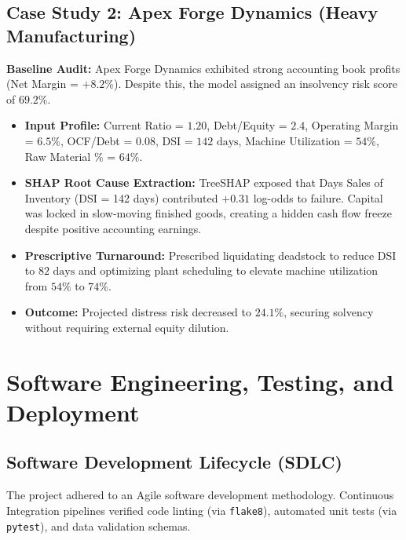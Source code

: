 \documentclass[11pt, a4paper]{article}
\begin{document}
\subsection{Case Study 2: Apex Forge Dynamics (Heavy Manufacturing)}
\textbf{Baseline Audit:} Apex Forge Dynamics exhibited strong accounting book profits (Net Margin = $+8.2\%$). Despite this, the model assigned an insolvency risk score of $\mathbf{69.2\%}$.

\begin{itemize}
    \item \textbf{Input Profile:} Current Ratio = $1.20$, Debt/Equity = $2.4$, Operating Margin = $6.5\%$, OCF/Debt = $0.08$, DSI = $142\text{ days}$, Machine Utilization = $54\%$, Raw Material \% = $64\%$.
    \item \textbf{SHAP Root Cause Extraction:} TreeSHAP exposed that Days Sales of Inventory (DSI = 142 days) contributed $+0.31$ log-odds to failure. Capital was locked in slow-moving finished goods, creating a hidden cash flow freeze despite positive accounting earnings.
    \item \textbf{Prescriptive Turnaround:} Prescribed liquidating deadstock to reduce DSI to $82\text{ days}$ and optimizing plant scheduling to elevate machine utilization from $54\%$ to $74\%$.
    \item \textbf{Outcome:} Projected distress risk decreased to $\mathbf{24.1\%}$, securing solvency without requiring external equity dilution.
\end{itemize}

\clearpage

\section{Software Engineering, Testing, and Deployment}

\subsection{Software Development Lifecycle (SDLC)}
The project adhered to an Agile software development methodology. Continuous Integration pipelines verified code linting (via \texttt{flake8}), automated unit tests (via \texttt{pytest}), and data validation schemas.
\end{document}
